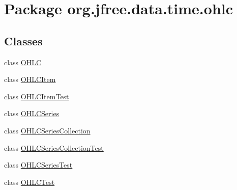 \hypertarget{namespaceorg_1_1jfree_1_1data_1_1time_1_1ohlc}{}\section{Package org.\+jfree.\+data.\+time.\+ohlc}
\label{namespaceorg_1_1jfree_1_1data_1_1time_1_1ohlc}
\subsection*{Classes}
\begin{DoxyCompactItemize}
\item 
class \mbox{\hyperlink{classorg_1_1jfree_1_1data_1_1time_1_1ohlc_1_1_o_h_l_c}{O\+H\+LC}}
\item 
class \mbox{\hyperlink{classorg_1_1jfree_1_1data_1_1time_1_1ohlc_1_1_o_h_l_c_item}{O\+H\+L\+C\+Item}}
\item 
class \mbox{\hyperlink{classorg_1_1jfree_1_1data_1_1time_1_1ohlc_1_1_o_h_l_c_item_test}{O\+H\+L\+C\+Item\+Test}}
\item 
class \mbox{\hyperlink{classorg_1_1jfree_1_1data_1_1time_1_1ohlc_1_1_o_h_l_c_series}{O\+H\+L\+C\+Series}}
\item 
class \mbox{\hyperlink{classorg_1_1jfree_1_1data_1_1time_1_1ohlc_1_1_o_h_l_c_series_collection}{O\+H\+L\+C\+Series\+Collection}}
\item 
class \mbox{\hyperlink{classorg_1_1jfree_1_1data_1_1time_1_1ohlc_1_1_o_h_l_c_series_collection_test}{O\+H\+L\+C\+Series\+Collection\+Test}}
\item 
class \mbox{\hyperlink{classorg_1_1jfree_1_1data_1_1time_1_1ohlc_1_1_o_h_l_c_series_test}{O\+H\+L\+C\+Series\+Test}}
\item 
class \mbox{\hyperlink{classorg_1_1jfree_1_1data_1_1time_1_1ohlc_1_1_o_h_l_c_test}{O\+H\+L\+C\+Test}}
\end{DoxyCompactItemize}
